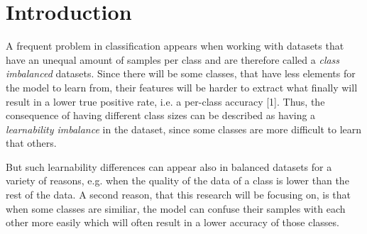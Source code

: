 \documentclass[journal]{IEEEtran}
\begin{document}
\section{Introduction}
A frequent problem in classification appears when working with datasets that have an unequal amount of samples per class and are therefore called a \emph{class imbalanced} datasets. %
Since there will be some classes, that have less elements for the model to learn from, their features will be harder to extract what finally will result in a lower true positive rate, i.e. a per-class accuracy [1].
Thus, the consequence of having different class sizes can be described as having a \emph{learnability imbalance} in the dataset, since some classes are more difficult to learn that others.


But such learnability differences can appear also in balanced datasets for a variety of reasons, e.g. when the quality of the data of a class is lower than the rest of the data. %
A second reason, that this research will be focusing on, is that when some classes are similiar, %
the model can confuse their samples with each other more easily which will often result in a lower accuracy of those classes.
\end{document}
